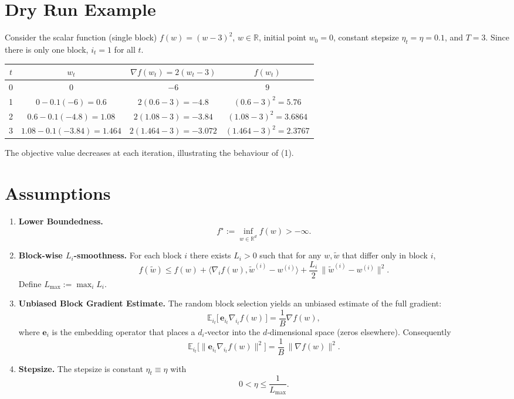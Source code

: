 \documentclass{article}
\newcommand{\E}{\mathbb{E}}
\newcommand{\R}{\mathbb{R}}
\newcommand{\norm}[1]{\lVert #1\rVert}
\begin{document}
\section*{Dry Run Example}
Consider the scalar function (single block) $f(w)=(w-3)^2$, $w\in\R$,
initial point $w_0=0$, constant stepsize $\eta_t=\eta=0.1$, and $T=3$.
Since there is only one block, $i_t=1$ for all $t$.

\begin{tabular}{c|c|c|c}
$t$ & $w_t$ & $\nabla f(w_t)=2(w_t-3)$ & $f(w_t)$\\ \hline
0 & $0$ & $-6$ & $9$\\
1 & $0-0.1(-6)=0.6$ & $2(0.6-3)=-4.8$ & $(0.6-3)^2=5.76$\\
2 & $0.6-0.1(-4.8)=1.08$ & $2(1.08-3)=-3.84$ & $(1.08-3)^2=3.6864$\\
3 & $1.08-0.1(-3.84)=1.464$ & $2(1.464-3)=-3.072$ & $(1.464-3)^2=2.3767$
\end{tabular}

The objective value decreases at each iteration, illustrating the
behaviour of (1).

\newpage

\section*{Assumptions}
\begin{enumerate}[label=(A\arabic*)]
\item \textbf{Lower Boundedness.}
\[
f^\star := \inf_{w\in\R^{d}} f(w) > -\infty .
\tag{A1}
\]
\item \textbf{Block-wise $L_i$-smoothness.}
For each block $i$ there exists $L_i>0$ such that for any $w,\tilde w$ that differ
only in block $i$,
\[
f(\tilde w) \le f(w) + \langle \nabla_i f(w),\tilde w^{(i)}-w^{(i)}\rangle
      + \frac{L_i}{2}\,\norm{\tilde w^{(i)}-w^{(i)}}^{2}.
\tag{A2}
\]
Define $L_{\max}:=\max_i L_i$.
\item \textbf{Unbiased Block Gradient Estimate.}
The random block selection yields an unbiased estimate of the full gradient:
\[
\E_{i_t}\big[\,\mathbf{e}_{i_t}\nabla_{i_t}f(w)\,\big]=\frac{1}{B}\nabla f(w),
\tag{A3}
\]
where $\mathbf{e}_{i}$ is the embedding operator that places a $d_i$‑vector
into the $d$‑dimensional space (zeros elsewhere).  Consequently
\[
\E_{i_t}\big[\norm{\mathbf{e}_{i_t}\nabla_{i_t}f(w)}^{2}\big]
      =\frac{1}{B}\,\norm{\nabla f(w)}^{2}.
\tag{A4}
\]
\item \textbf{Stepsize.}
The stepsize is constant $\eta_t\equiv\eta$ with
\[
0<\eta\le\frac{1}{L_{\max}} .
\tag{A5}
\]
\end{enumerate}
\end{document}
